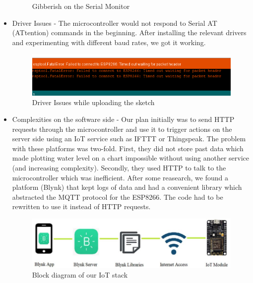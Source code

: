 \documentclass[12pt]{article}
\begin{document}
\begin{itemize}
\begin{figure}[H]
    \caption{Gibberish on the Serial Monitor}
\end{figure}
\item Driver Issues - The microcontroller would not respond to Serial AT (ATtention) commands in the beginning. After installing the relevant drivers and experimenting with different baud rates, we got it working.
\begin{figure}[H]
\centering
    \includegraphics[scale=0.55]{timeout.png}
    \caption{Driver Issues while uploading the sketch}
\end{figure}
\item Complexities on the software side - Our plan initially was to send HTTP requests through the microcontroller and use it to trigger actions on the server side using an IoT service such as IFTTT or Thingspeak. The problem with these platforms was two-fold. First, they did not store past data which made plotting water level on a chart impossible without using another service (and increasing complexity). Secondly, they used HTTP to talk to the microcontroller which was inefficient. After some reasearch, we found a platform (Blynk) that kept logs of data and had a convenient library which abstracted the MQTT protocol for the ESP8266. The code had to be rewritten to use it instead of HTTP requests.
\begin{figure}[H]
\centering
    \includegraphics[scale=0.45]{blynk.jpg}
    \caption{Block diagram of our IoT stack}
\end{figure}
\end{itemize}

\vspace{8cm}
\end{document}
